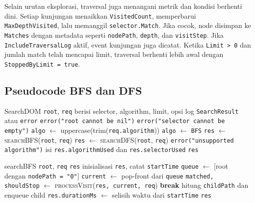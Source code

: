 Selain urutan eksplorasi, traversal juga menangani metrik dan kondisi berhenti dini. Setiap kunjungan menaikkan \texttt{VisitedCount}, memperbarui \texttt{MaxDepthVisited}, lalu memanggil \texttt{selector.Match}. Jika cocok, node disimpan ke \texttt{Matches} dengan metadata seperti \texttt{nodePath}, \texttt{depth}, dan \texttt{visitStep}. Jika \texttt{IncludeTraversalLog} aktif, event kunjungan juga dicatat. Ketika \texttt{Limit > 0} dan jumlah match telah mencapai limit, traversal berhenti lebih awal dengan \texttt{StoppedByLimit = true}.

\subsection{Pseudocode BFS dan DFS}

\begin{ieeealgorithm}{SearchDOM}
    \Require \texttt{root}, \texttt{req} berisi selector, algorithm, limit, opsi log
    \Ensure \texttt{SearchResult} atau \texttt{error}
    \State \Return \texttt{error("root cannot be nil")}
    \EndIf
    \State \Return \texttt{error("selector cannot be empty")}
    \EndIf
    \State \texttt{algo} $\gets$ uppercase(trim(\texttt{req.algorithm}))
    \State \texttt{algo} $\gets$ \texttt{BFS}
    \EndIf
    \State \texttt{res} $\gets$ \textsc{searchBFS}(\texttt{root}, \texttt{req})
    \State \texttt{res} $\gets$ \textsc{searchDFS}(\texttt{root}, \texttt{req})
    \Else
    \State \Return \texttt{error("unsupported algorithm")}
    \EndIf
    \State isi \texttt{res.algorithmUsed} dan \texttt{res.selectorUsed}
    \State \Return \texttt{res}
\end{ieeealgorithm}

\begin{ieeealgorithm}{searchBFS}
    \Require \texttt{root}, \texttt{req}
    \Ensure \texttt{res}
    \State inisialisasi \texttt{res}, catat \texttt{startTime}
    \State \texttt{queue} $\gets$ [root dengan \texttt{nodePath = "0"}]
    \State \texttt{current} $\gets$ pop-front dari \texttt{queue}
    \State \texttt{matched, shouldStop} $\gets$ \textsc{processVisit}(\texttt{res, current, req})
    \State \textbf{break}
    \EndIf
    \State hitung \texttt{childPath} dan enqueue child
    \EndFor
    \EndWhile
    \State \texttt{res.durationMs} $\gets$ selisih waktu dari \texttt{startTime}
    \State \Return \texttt{res}
\end{ieeealgorithm}

